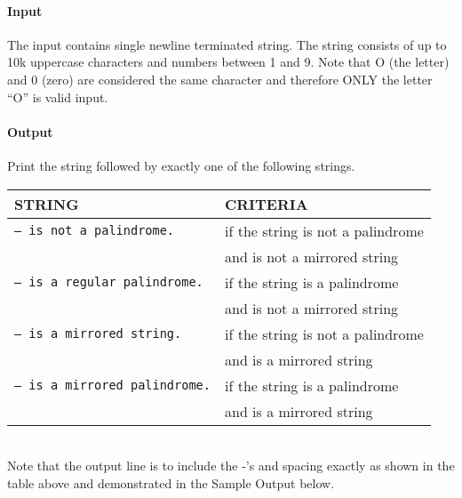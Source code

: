 \paragraph*{Input}

The input contains single newline terminated string.
The string consists of up to 10k uppercase characters and numbers between 1 and 9. 
Note that O (the letter) and 0 (zero) are considered the same character and therefore ONLY the letter ``O'' is valid input.

\paragraph*{Output}

Print the string followed by exactly one of the following strings.\\

\begin{tabular}{l|l}
STRING & CRITERIA\\
\hline
\texttt{-- is not a palindrome.} & if the string is not a palindrome\\ & and is not a mirrored string\\
\hline
\texttt{-- is a regular palindrome.} & if the string is a palindrome\\ &  and is not a mirrored string\\
\hline
\texttt{-- is a mirrored string.} & if the string is not a palindrome\\ &  and is a mirrored string\\
\hline
\texttt{-- is a mirrored palindrome.} & if the string is a palindrome\\ &  and is a mirrored string\\
\end{tabular}\\

Note that the output line is to include the -'s and spacing exactly as shown in the table above and demonstrated in the Sample Output below.

\begin{samples}[0.5]
\end{samples}



